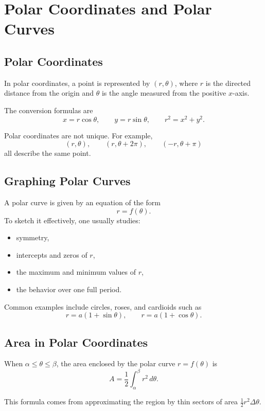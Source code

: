 \chapter*{Polar Coordinates and Polar Curves}

\section*{Polar Coordinates}

In polar coordinates, a point is represented by $(r,\theta)$, where $r$ is the directed distance from the origin and $\theta$ is the angle measured from the positive $x$-axis.

The conversion formulas are
$$x=r\cos\theta, \qquad y=r\sin\theta, \qquad r^2=x^2+y^2.$$ 

Polar coordinates are not unique. For example,
$$(r,\theta), \qquad (r,\theta+2\pi), \qquad (-r,\theta+\pi)$$
all describe the same point.

\section*{Graphing Polar Curves}

A polar curve is given by an equation of the form
$$r=f(\theta).$$ 
To sketch it effectively, one usually studies:
\begin{itemize}
    \item symmetry,
    \item intercepts and zeros of $r$,
    \item the maximum and minimum values of $r$,
    \item the behavior over one full period.
\end{itemize}

Common examples include circles, roses, and cardioids such as
$$r=a(1+\sin\theta), \qquad r=a(1+\cos\theta).$$ 

\section*{Area in Polar Coordinates}

When $\alpha\le \theta\le \beta$, the area enclosed by the polar curve $r=f(\theta)$ is
$$A = \frac12\int_{\alpha}^{\beta} r^2\,d\theta.$$ 

\begin{remark}
This formula comes from approximating the region by thin sectors of area
$\frac12 r^2\Delta\theta$.
\end{remark}

